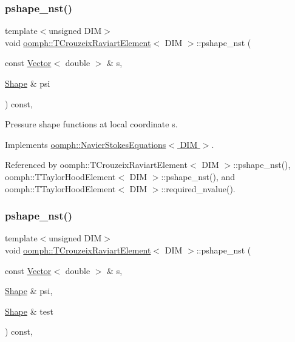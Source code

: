 \subsubsection{\texorpdfstring{pshape\+\_\+nst()}{pshape\_nst()}\hspace{0.1cm}{\footnotesize\ttfamily [1/6]}}
{\footnotesize\ttfamily template$<$unsigned D\+IM$>$ \\
void \hyperlink{classoomph_1_1TCrouzeixRaviartElement}{oomph\+::\+T\+Crouzeix\+Raviart\+Element}$<$ D\+IM $>$\+::pshape\+\_\+nst (\begin{DoxyParamCaption}\item[{const \hyperlink{classoomph_1_1Vector}{Vector}$<$ double $>$ \&}]{s,  }\item[{\hyperlink{classoomph_1_1Shape}{Shape} \&}]{psi }\end{DoxyParamCaption}) const\hspace{0.3cm}{\ttfamily [inline]}, {\ttfamily [virtual]}}



Pressure shape functions at local coordinate s. 



Implements \hyperlink{classoomph_1_1NavierStokesEquations_a487030303b71da299aed3d4639a022ab}{oomph\+::\+Navier\+Stokes\+Equations$<$ D\+I\+M $>$}.



Referenced by oomph\+::\+T\+Crouzeix\+Raviart\+Element$<$ D\+I\+M $>$\+::pshape\+\_\+nst(), oomph\+::\+T\+Taylor\+Hood\+Element$<$ D\+I\+M $>$\+::pshape\+\_\+nst(), and oomph\+::\+T\+Taylor\+Hood\+Element$<$ D\+I\+M $>$\+::required\+\_\+nvalue().

\mbox{\label{classoomph_1_1TCrouzeixRaviartElement_ae9eed6d89a009cced2b3ab8838215cdf}} 
\subsubsection{\texorpdfstring{pshape\+\_\+nst()}{pshape\_nst()}\hspace{0.1cm}{\footnotesize\ttfamily [2/6]}}
{\footnotesize\ttfamily template$<$unsigned D\+IM$>$ \\
void \hyperlink{classoomph_1_1TCrouzeixRaviartElement}{oomph\+::\+T\+Crouzeix\+Raviart\+Element}$<$ D\+IM $>$\+::pshape\+\_\+nst (\begin{DoxyParamCaption}\item[{const \hyperlink{classoomph_1_1Vector}{Vector}$<$ double $>$ \&}]{s,  }\item[{\hyperlink{classoomph_1_1Shape}{Shape} \&}]{psi,  }\item[{\hyperlink{classoomph_1_1Shape}{Shape} \&}]{test }\end{DoxyParamCaption}) const\hspace{0.3cm}{\ttfamily [inline]}, {\ttfamily [virtual]}}



